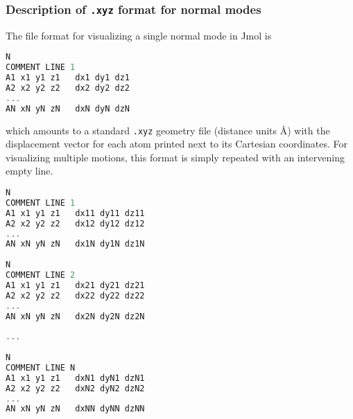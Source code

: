 \documentclass[fleqn]{article}
\newcommand{\linl}[1]{\lstinline{#1}{}}
\begin{document}
\subsubsection*{Description of \linl{.xyz} format for normal modes}
The file format for visualizing a single normal mode in Jmol is
\begin{addmargin}{5cm}{}
\begin{lstlisting}[language=c++]
N
COMMENT LINE 1
A1 x1 y1 z1   dx1 dy1 dz1
A2 x2 y2 z2   dx2 dy2 dz2
...                        
AN xN yN zN   dxN dyN dzN
\end{lstlisting}
\end{addmargin}
which amounts to a standard \linl{.xyz} geometry file (distance units \AA) with the displacement vector for each atom printed next to
its Cartesian coordinates. For visualizing multiple motions, this format is
simply repeated with an intervening empty line.
\begin{addmargin}{5cm}{}
\begin{lstlisting}[language=c++]
N
COMMENT LINE 1
A1 x1 y1 z1   dx11 dy11 dz11
A2 x2 y2 z2   dx12 dy12 dz12
...                        
AN xN yN zN   dx1N dy1N dz1N
                           
N                          
COMMENT LINE 2             
A1 x1 y1 z1   dx21 dy21 dz21
A2 x2 y2 z2   dx22 dy22 dz22
...                        
AN xN yN zN   dx2N dy2N dz2N
                           
...                        
                           
N                          
COMMENT LINE N             
A1 x1 y1 z1   dxN1 dyN1 dzN1
A2 x2 y2 z2   dxN2 dyN2 dzN2
...                        
AN xN yN zN   dxNN dyNN dzNN
\end{lstlisting}
\end{addmargin}
\end{document}
